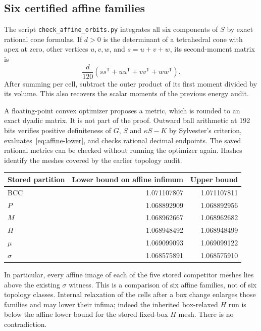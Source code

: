 \documentclass[11pt,a4paper]{report}
\begin{document}
\subsection{Six certified affine families}

The script \texttt{check\_affine\_orbits.py} integrates all six components
of $S$ by exact rational cone formulas. If $d>0$ is the determinant of
a tetrahedral cone with apex at zero, other vertices $u,v,w$, and
$s=u+v+w$, its second-moment matrix is
\[
 \frac d{120}(ss^{\mathsf T}+uu^{\mathsf T}+vv^{\mathsf T}+ww^{\mathsf T}).
\]
After summing per cell, subtract the outer product of its first moment
divided by its volume. This also recovers the scalar moments of the
previous energy audit.

A floating-point convex optimizer proposes a metric, which is rounded to
an exact dyadic matrix. It is not part of the proof. Outward ball
arithmetic at 192 bits verifies positive definiteness of $G$, $S$ and
$\kappa S-K$ by Sylvester's criterion, evaluates~\eqref{eq:affine-lower},
and checks rational decimal endpoints. The saved rational metrics can be
checked without running the optimizer again. Hashes identify the meshes
covered by the earlier topology audit.

\begin{center}
\begin{tabular}{lrr}
\toprule
Stored partition & Lower bound on affine infimum & Upper bound \\
\midrule
BCC & 1.071107807 & 1.071107811 \\
$P$ & 1.068892909 & 1.068892956 \\
$M$ & 1.068962667 & 1.068962682 \\
$H$ & 1.068948492 & 1.068948499 \\
$\mu$ & 1.069099093 & 1.069099122 \\
$\sigma$ & 1.068575891 & 1.068575910 \\
\bottomrule
\end{tabular}
\end{center}

In particular, every affine image of each of the five stored competitor
meshes lies above the existing $\sigma$ witness. This is a comparison of
six affine families, not of six topology classes. Internal relaxation of
the cells after a box change enlarges those families and may lower their
infima; indeed the inherited box-relaxed $H$ run is below the affine lower
bound for the stored fixed-box $H$ mesh. There is no contradiction.
\end{document}
